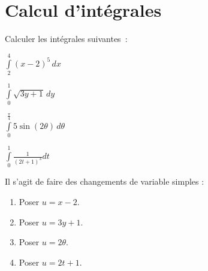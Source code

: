 \documentclass[11pt,class=report,crop=false]{standalone}
\begin{document}

\section*{Calcul d'intégrales}



\exercice{}
\enonce
Calculer les intégrales suivantes~:
    \begin{examplescol}{4}
        \item $\int \limits _{2} ^{4} (x-2)^{5}\,dx$
        \item $\int \limits _{0} ^{1} \sqrt{3y+1}\, dy$
        \item $\int \limits _{0} ^{\frac{\pi}{4}} 5\sin(2\theta) \,d\theta$
        \item $\int \limits _{0} ^{1} \frac{1}{(2t+1)^{3}} dt$
    \end{examplescol}
\finenonce

\indication
Il s'agit de faire des changements de variable simples :
\begin{enumerate}
	\item Poser $u= x-2$.
	\item Poser $u=3y+1$.
	\item Poser $u = 2\theta$.
	\item Poser $u = 2t+1$. 
\end{enumerate}
\finindication

\correction

\end{document}
